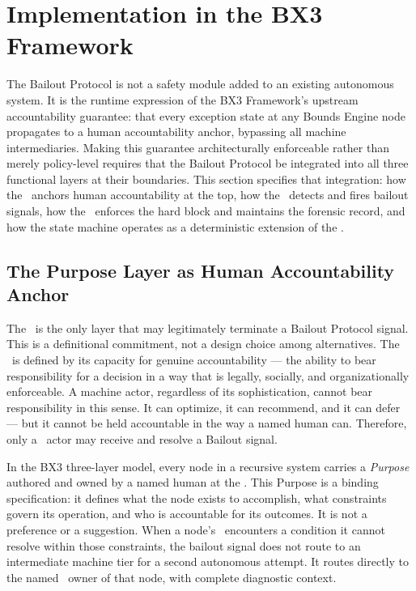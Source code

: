 \section{Implementation in the BX3 Framework}
\label{sec:bailout-implementation}

The Bailout Protocol is not a safety module added to an existing autonomous system. It is the runtime expression of the BX3 Framework's upstream accountability guarantee: that every exception state at any Bounds Engine node propagates to a human accountability anchor, bypassing all machine intermediaries. Making this guarantee architecturally enforceable rather than merely policy-level requires that the Bailout Protocol be integrated into all three functional layers at their boundaries. This section specifies that integration: how the \purpose\ anchors human accountability at the top, how the \bounds\ detects and fires bailout signals, how the \fact\ enforces the hard block and maintains the forensic record, and how the state machine operates as a deterministic extension of the \fact.

\subsection{The Purpose Layer as Human Accountability Anchor}
\label{sec:purpose-anchor}

The \purpose\ is the only layer that may legitimately terminate a Bailout Protocol signal. This is a definitional commitment, not a design choice among alternatives. The \purpose\ is defined by its capacity for genuine accountability --- the ability to bear responsibility for a decision in a way that is legally, socially, and organizationally enforceable. A machine actor, regardless of its sophistication, cannot bear responsibility in this sense. It can optimize, it can recommend, and it can defer --- but it cannot be held accountable in the way a named human can. Therefore, only a \purpose\ actor may receive and resolve a Bailout signal.

In the BX3 three-layer model, every node in a recursive system carries a \textit{Purpose} authored and owned by a named human at the \purpose. This Purpose is a binding specification: it defines what the node exists to accomplish, what constraints govern its operation, and who is accountable for its outcomes. It is not a preference or a suggestion. When a node's \bounds\ encounters a condition it cannot resolve within those constraints, the bailout signal does not route to an intermediate machine tier for a second autonomous attempt. It routes directly to the named \purpose\ owner of that node, with complete diagnostic context.


